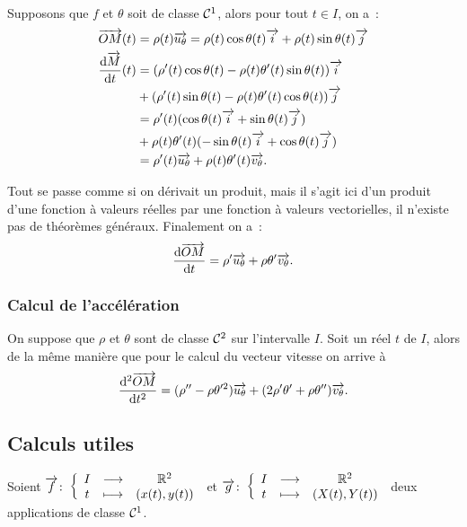 Supposons que \(f\) et \(\theta\) soit de classe \(\mathcal{C}^{1}\), alors pour tout 
\(t \in I\), on a~:
\begin{align}
  \overrightarrow{OM}(t)&=\rho(t) \overrightarrow{u_\theta}=\rho(t)\cos \theta(t) \overrightarrow{i} + \rho(t)\sin 
  \theta(t) \overrightarrow{j} \\
  \dfrac{\mathrm{d} \overrightarrow{M}}{\mathrm{d} t}(t)
              &=(\rho'(t) \cos \theta(t) - \rho(t) \theta'(t) \sin \theta(t)) 
              \overrightarrow{i} \\
              & + (\rho'(t) \sin \theta(t) - \rho(t) \theta'(t) \cos 
              \theta(t)) \overrightarrow{j} \notag\\
              &=\rho'(t) (\cos \theta(t) \overrightarrow{i} + \sin\theta(t) \overrightarrow{j}) \\
              & + \rho(t)\theta'(t)(-\sin\theta(t)\overrightarrow{i} + 
              \cos\theta(t)\overrightarrow{j}) \notag\\
              &=\rho'(t)\overrightarrow{u_\theta} + 
              \rho(t)\theta'(t)\overrightarrow{v_\theta}.
\end{align}

Tout se passe comme si on dérivait un produit, mais il s'agit ici d'un produit 
d'une fonction à valeurs réelles par une fonction à valeurs vectorielles, il 
n'existe pas de théorèmes généraux. Finalement on a~:
\begin{equation}
  \dfrac{\mathrm{d} \overrightarrow{OM}}{\mathrm{d} t} = \rho' \overrightarrow{u_\theta} + \rho \theta' \overrightarrow{v_\theta}.
\end{equation}

\subsubsection{Calcul de l'accélération}

On suppose que \(\rho\) et \(\theta\) sont de classe \(\mathcal{C}^{2}\) sur 
l'intervalle \(I\). Soit un réel \(t\) de \(I\), alors de la même manière que 
pour le calcul du vecteur vitesse on arrive à
\begin{equation}
  \dfrac{\mathrm{d}^2 \overrightarrow{OM}}{\mathrm{d} {t}^2}=(\rho''-\rho\theta'^2)\overrightarrow{u_\theta} + 
  (2\rho'\theta'+\rho\theta'')\overrightarrow{v_\theta}.
\end{equation}

\subsection{Calculs utiles}

Soient \(\overrightarrow{f}\colon \left\{\begin{array}{ccc} I & \longrightarrow &\mathbb{R}^2\\ t & \longmapsto & (x(t),y(t)) \end{array} \right.\) et 
\(\overrightarrow{g}\colon \left\{\begin{array}{ccc} I & \longrightarrow &\mathbb{R}^2\\ t & \longmapsto & (X(t),Y(t)) \end{array} \right.\) deux applications de classe 
\(\mathcal{C}^{1}\).

